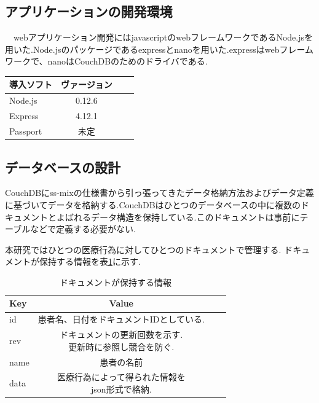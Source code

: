 \subsection{アプリケーションの開発環境}
　webアプリケーション開発にはjavascriptのwebフレームワークであるNode.jsを用いた.Node.jsのパッケージであるexpressとnanoを用いた.expressはwebフレームワークで、nanoはCouchDBのためのドライバである.

\begin{table}[htb]
	\begin{tabular}{|l|c|r|r|}\hline
	導入ソフト & ヴァージョン \\ \hline \hline
	Node.js & 0.12.6 \\ \hline
	Express & 4.12.1 \\ \hline
	Passport & 未定 \\ \hline
	\end{tabular}
\end{table}


\subsection{データベースの設計}
	CouchDBにss-mixの仕様書から引っ張ってきたデータ格納方法およびデータ定義\cite{bibi1}に基づいてデータを格納する.CouchDBはひとつのデータベースの中に複数のドキュメントとよばれるデータ構造を保持している.このドキュメントは事前にテーブルなどで定義する必要がない.

	本研究ではひとつの医療行為に対してひとつのドキュメントで管理する.
	ドキュメントが保持する情報を表\ref{tab:doc}に示す.


	\begin{table}[htb]
		\begin{center}
			\caption{ドキュメントが保持する情報}
			\begin{tabular}{|l|c|r|r|}\hline
			Key & Value \\ \hline \hline
			id &  患者名、日付をドキュメントIDとしている. \\ \hline
			rev & \shortstack{ドキュメントの更新回数を示す. \\ 更新時に参照し競合を防ぐ.} \\ \hline
			name & 患者の名前 \\ \hline
			data & \shortstack{医療行為によって得られた情報を \\ json形式で格納.} \\ \hline
			\end{tabular}
			\label{tab:doc}
		\end{center}
	\end{table}

